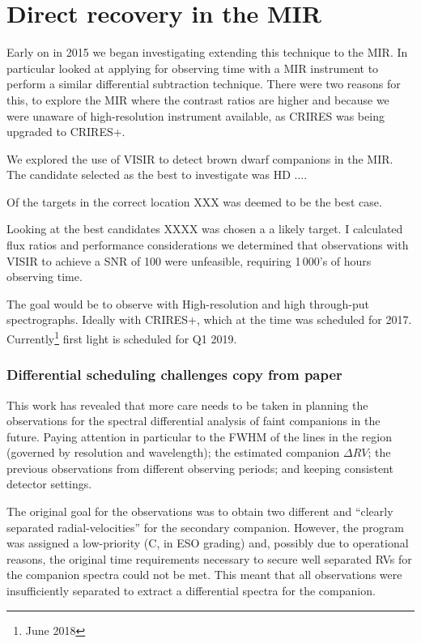 \section{Direct recovery in the {MIR}}
Early on in 2015 we began investigating extending this technique to the {MIR}. In particular looked at applying for observing time with a {MIR} instrument to perform a similar differential subtraction technique.
There were two reasons for this, to explore the {MIR} where the contrast ratios are higher and because we were unaware of high-resolution \nir{} instrument available, as {CRIRES} was being upgraded to {CRIRES+}.

We explored the use of {VISIR} to detect brown dwarf companions in the {MIR}. The candidate selected as the best to investigate was HD ....


Of the targets in the correct location XXX was deemed to be the best case.

Looking at the best candidates XXXX was chosen a a likely target. I calculated flux ratios and performance considerations we determined that observations with VISIR to achieve a {SNR} of 100 were unfeasible, requiring 1\,000's of hours observing time.

The goal would be to observe with High-resolution and high through-put spectrographs. Ideally with {CRIRES+}, which at the time was scheduled for 2017. Currently\footnote{June 2018} first light is scheduled for Q1 2019.




\subsubsection{Differential scheduling challenges {copy from paper}}
\label{subsubsec:differential-schedualing}
This work has revealed that more care needs to be taken in planning the observations for the spectral differential analysis of faint companions in the future.
Paying attention in particular to the {FWHM} of the lines in the region (governed by resolution and wavelength); the estimated companion \(\Delta {RV}\); the previous observations from different observing periods; and keeping consistent detector settings.

The original goal for the observations was to obtain two different and ``clearly separated radial-velocities'' for the secondary companion.
However, the program was assigned a low-priority (C, in ESO grading) and, possibly due to operational reasons, the original time requirements necessary to secure well separated RVs for the companion spectra could not be met.
This meant that all observations were insufficiently separated to extract a differential spectra for the companion.

